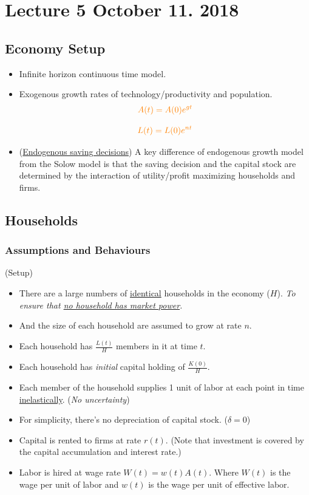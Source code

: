 \documentclass[11pt]{article}
\begin{document}
	\section{Lecture 5 October 11. 2018}
	\subsection{Economy Setup}
	\begin{itemize}
		\item Infinite horizon continuous time model.
		\item Exogenous growth rates of technology/productivity and population.
		\begin{equation}\textcolor{orange}{
			A(t) = A(0) e^{gt}}
		\end{equation}
		
		\begin{equation}\textcolor{orange}{
			L(t) = L(0) e^{nt}
			}
		\end{equation}
		\item (\ul{Endogenous saving decisions}) A key difference of endogenous growth model from the Solow model is that the saving decision and the capital stock are determined by the interaction of utility/profit maximizing households and firms.
	\end{itemize}
	
	\subsection{Households}
	\subsubsection{Assumptions and Behaviours}
	\begin{assumption}(Setup)
		\begin{itemize}
			\item There are a large numbers of \ul{identical} households in the economy ($H$). \emph{To ensure that \ul{no household has market power}.}
			\item And the size of each household are assumed to grow at rate $n$.
			\item Each household has $\frac{L(t)}{H}$ members in it at time $t$.
			\item Each household has \emph{initial} capital holding of $\frac{K(0)}{H}$.
			\item Each member of the household supplies 1 unit of labor at each point in time \ul{inelastically}. (\emph{No uncertainty})
			\item For simplicity, there's no depreciation of capital stock. ($\delta = 0$)
			\item Capital is rented to firms at rate $r(t)$. (Note that investment is covered by the capital accumulation and interest rate.)
			\item Labor is hired at wage rate $W(t) = w(t)A(t)$. Where $W(t)$ is the wage per unit of labor and $w(t)$ is the wage per unit of effective labor.
		\end{itemize}
	\end{assumption}
	
\end{document}
